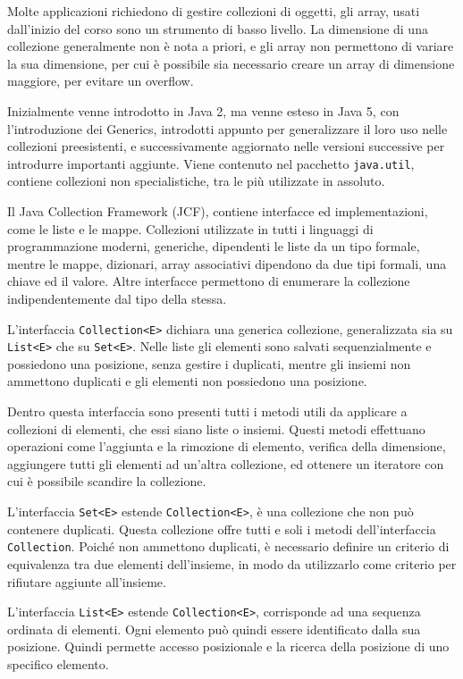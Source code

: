 \documentclass{article}
\numberwithin{equation}{subsection}
\begin{document}
Molte applicazioni richiedono di gestire collezioni di oggetti, gli array, usati dall'inizio del corso sono un strumento di basso livello. La dimensione di una collezione 
generalmente non è nota a priori, e gli array non permettono di variare la sua dimensione, per cui è possibile sia necessario creare un array di dimensione maggiore, per 
evitare un overflow. 

Inizialmente venne introdotto in Java 2, ma venne esteso in Java 5, con l'introduzione dei Generics, introdotti appunto per generalizzare il loro uso nelle collezioni 
preesistenti, e successivamente aggiornato nelle versioni successive per introdurre importanti aggiunte. 
Viene contenuto nel pacchetto \verb|java.util|, contiene collezioni non specialistiche, tra le più utilizzate in assoluto. 

Il Java Collection Framework (JCF), contiene interfacce ed implementazioni, come le liste e le mappe. Collezioni utilizzate in tutti i linguaggi di programmazione moderni, 
generiche, dipendenti le liste da un tipo formale, mentre le mappe, dizionari, array associativi dipendono da due tipi formali, una chiave ed il valore. 
Altre interfacce permettono di enumerare la collezione indipendentemente dal tipo della stessa. 

L'interfaccia \verb|Collection<E>| dichiara una generica collezione, generalizzata sia su \verb|List<E>| che su \verb|Set<E>|. Nelle liste gli elementi sono salvati sequenzialmente 
e possiedono una posizione, senza gestire i duplicati, mentre gli insiemi non ammettono duplicati e gli elementi non possiedono una posizione. 

Dentro questa interfaccia sono presenti tutti i metodi utili da applicare a collezioni di elementi, che essi siano liste o insiemi. Questi metodi effettuano operazioni 
come l'aggiunta e la rimozione di elemento, verifica della dimensione, aggiungere tutti gli elementi ad un'altra collezione, ed ottenere un iteratore con cui 
è possibile scandire la collezione. 


L'interfaccia \verb|Set<E>| estende \verb|Collection<E>|, è una collezione che non può contenere duplicati. Questa collezione offre tutti e soli i metodi dell'interfaccia 
\verb|Collection|. 
Poiché non ammettono duplicati, è necessario definire un criterio di equivalenza tra due elementi dell'insieme, in modo da utilizzarlo come criterio per rifiutare aggiunte 
all'insieme. 

L'interfaccia \verb|List<E>| estende \verb|Collection<E>|, corrisponde ad una sequenza ordinata di elementi. Ogni elemento può quindi essere identificato dalla sua posizione. Quindi 
permette accesso posizionale e la ricerca della posizione di uno specifico elemento. 
\end{document}
